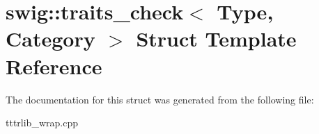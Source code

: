 \hypertarget{structswig_1_1traits__check}{}\section{swig\+:\+:traits\+\_\+check$<$ Type, Category $>$ Struct Template Reference}
\label{structswig_1_1traits__check}


The documentation for this struct was generated from the following file\+:\begin{DoxyCompactItemize}
\item 
tttrlib\+\_\+wrap.\+cpp\end{DoxyCompactItemize}
